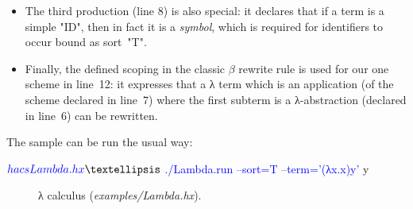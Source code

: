 \documentclass[11pt]{article} %
\begin{document}
\begin{example}
\begin{itemize}
  \item The third production (line 8) is also special: it declares that if a term is a simple "ID",
    then in fact it is a \emph{symbol}, which is required for identifiers to occur bound as
    sort~"T".

  \item Finally, the defined scoping in the classic $β$ rewrite rule is used for our one scheme in
    line~12: it expresses that a λ term which is an application (of the scheme declared in line~7)
    where the first subterm is a λ-abstraction (declared in line~6) can be rewritten.

  \end{itemize}
  The sample can be run the usual way:
  \begin{code}[commandchars=\\\{\}]
$ \textcolor{blue}{hacs Lambda.hx}
…
$ \textcolor{blue}{./Lambda.run --sort=T --term='(λx.x)y'}
 y
  \end{code}
\end{example}

\begin{figure}[t]
  \caption{λ calculus (\emph{examples/Lambda.hx}).}
  \label{fig:lambda}
\end{figure}
\end{document}
